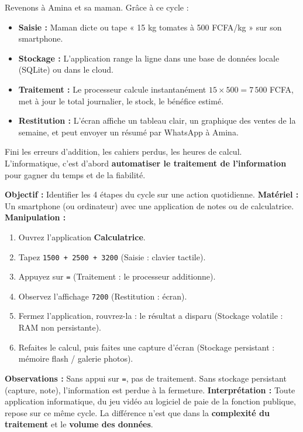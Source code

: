 \documentclass[11pt]{article}
\begin{document}
\noindent
Revenons à Amina et sa maman. Grâce à ce cycle :
\begin{itemize}
    \item \textbf{Saisie :} Maman dicte ou tape « 15 kg tomates à 500 FCFA/kg » sur son smartphone.
    \item \textbf{Stockage :} L'application range la ligne dans une base de données locale (SQLite) ou dans le cloud.
    \item \textbf{Traitement :} Le processeur calcule instantanément $15 \times 500 = 7\,500$ FCFA, met à jour le total journalier, le stock, le bénéfice estimé.
    \item \textbf{Restitution :} L'écran affiche un tableau clair, un graphique des ventes de la semaine, et peut envoyer un résumé par WhatsApp à Amina.
\end{itemize}
Fini les erreurs d'addition, les cahiers perdus, les heures de calcul. L'informatique, c'est d'abord \textbf{automatiser le traitement de l'information} pour gagner du temps et de la fiabilité.

\begin{experience}
\textbf{Objectif :} Identifier les 4 étapes du cycle sur une action quotidienne.
\textbf{Matériel :} Un smartphone (ou ordinateur) avec une application de notes ou de calculatrice.
\textbf{Manipulation :}
\begin{enumerate}
    \item Ouvrez l'application \textbf{Calculatrice}.
    \item Tapez \texttt{1500 + 2500 + 3200} (Saisie : clavier tactile).
    \item Appuyez sur \texttt{=} (Traitement : le processeur additionne).
    \item Observez l'affichage \texttt{7200} (Restitution : écran).
    \item Fermez l'application, rouvrez-la : le résultat a disparu (Stockage volatile : RAM non persistante).
    \item Refaites le calcul, puis faites une capture d'écran (Stockage persistant : mémoire flash / galerie photos).
\end{enumerate}
\textbf{Observations :} Sans appui sur \texttt{=}, pas de traitement. Sans stockage persistant (capture, note), l'information est perdue à la fermeture.
\textbf{Interprétation :} Toute application informatique, du jeu vidéo au logiciel de paie de la fonction publique, repose sur ce même cycle. La différence n'est que dans la \textbf{complexité du traitement} et le \textbf{volume des données}.
\end{experience}
\end{document}
